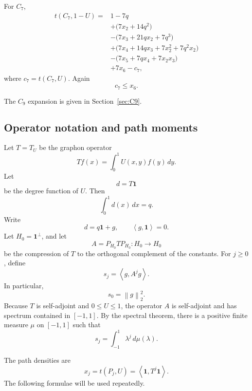 \documentclass[11pt]{article}
\newcommand{\one}{\mathbf 1}
\newcommand{\ip}[2]{\left\langle #1,#2\right\rangle}
\newcommand{\norm}[1]{\left\|#1\right\|}
\begin{document}
For $C_7$,
\begin{equation}\label{eq:C7-expansion}
\begin{aligned}
    t(C_7,1-U)
    ={}&1-7q \\
    &+\bigl(7x_2+14q^2\bigr)\\
    &-\bigl(7x_3+21qx_2+7q^3\bigr)\\
    &+\bigl(7x_4+14qx_3+7x_2^2+7q^2x_2\bigr)\\
    &-\bigl(7x_5+7qx_4+7x_2x_3\bigr)\\
    &+7x_6-c_7,
\end{aligned}
\end{equation}
where $c_7=t(C_7,U)$.  Again
\[
        c_7\le x_6.
\]

The $C_9$ expansion is given in Section~\ref{sec:C9}.

\subsection{Operator notation and path moments}\label{subsec:operator}

Let $T=T_U$ be the graphon operator
\[
        Tf(x)=\int_0^1 U(x,y)f(y)\,dy.
\]
Let
\[
        d=T\one
\]
be the degree function of $U$.  Then
\[
        \int_0^1 d(x)\,dx=q.
\]
Write
\[
        d=q\one+g,
        \qquad
        \ip{g}{\one}=0.
\]
Let $H_0=\one^\perp$, and let
\[
        A=P_{H_0}TP_{H_0}:H_0\to H_0
\]
be the compression of $T$ to the orthogonal complement of the constants.  For $j\ge0$, define
\[
        s_j=\ip{g}{A^jg}.
\]
In particular,
\[
        s_0=\norm{g}_2^2.
\]
Because $T$ is self-adjoint and $0\le U\le 1$, the operator $A$ is self-adjoint and has spectrum contained in $[-1,1]$.  By the spectral theorem, there is a positive finite measure $\mu$ on $[-1,1]$ such that
\[
        s_j=\int_{-1}^1 \lambda^j\,d\mu(\lambda).
\]

The path densities are
\[
        x_j=t(P_j,U)=\ip{\one}{T^j\one}.
\]
The following formulae will be used repeatedly.
\end{document}
